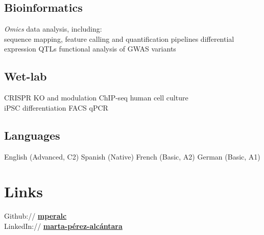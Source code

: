 \documentclass[letterpaper]{deedy-resume}
\begin{document}
\begin{minipage}[t]{0.29\textwidth}
		\sectionspace 
		
		\subsection{Bioinformatics}
		\textit{Omics} data analysis, including:\\
		\textbullet{} sequence mapping, feature calling and quantification pipelines \textbullet{} differential expression  \textbullet{} QTLs
		\textbullet{} functional analysis of GWAS variants
		
		\sectionspace 
				
		\subsection{Wet-lab}
		CRISPR KO and modulation \textbullet{} ChIP-seq \textbullet{} human cell culture \\
		iPSC differentiation \textbullet{} FACS \textbullet{} qPCR
		
		\sectionspace
		
		\subsection{Languages}
		English (Advanced, C2) \textbullet{} Spanish (Native)
		\textbullet{} French (Basic, A2) \textbullet{} German (Basic, A1)
		\sectionspace 
		\sectionspace
		
		\section{Links} 
		Github:// \href{https://github.com/mperalc}{\textbf{mperalc}} \\
		LinkedIn://  \href{https://www.linkedin.com/in/marta-p\%C3\%A9rez-alc\%C3\%A1ntara-51171861}{\textbf{marta-pérez-alcántara}} \\
		
		\sectionspace
	\end{minipage} 
	\hfill
\end{document}
